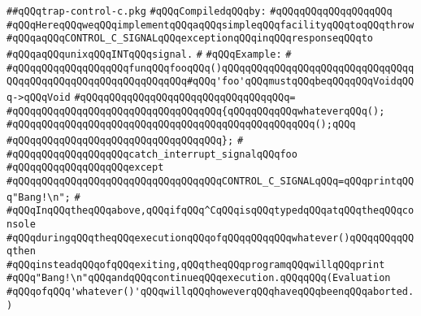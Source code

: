 \label{src/lib/std/trap-control-c.pkg}
\verb|##qQQqtrap-control-c.pkg|\newline
\newline
\verb|#qQQqCompiledqQQqby:|\newline
\verb|#qQQqqQQqqQQqqQQqqQQq|\newline
\newline
\newline
\verb|#qQQqHereqQQqweqQQqimplementqQQqaqQQqsimpleqQQqfacilityqQQqtoqQQqthrow|\newline
\verb|#qQQqaqQQqCONTROL_C_SIGNALqQQqexceptionqQQqinqQQqresponseqQQqto|\newline
\verb|#qQQqaqQQqunixqQQqINTqQQqsignal.|\newline
\verb|#|\newline
\verb|#qQQqExample:|\newline
\verb|#|\newline
\verb|#qQQqqQQqqQQqqQQqqQQqfunqQQqfooqQQq()qQQqqQQqqQQqqQQqqQQqqQQqqQQqqQQqqQQqqQQqqQQqqQQqqQQqqQQqqQQqqQQq#qQQq'foo'qQQqmustqQQqbeqQQqqQQqVoidqQQq->qQQqVoid|\newline
\verb|#qQQqqQQqqQQqqQQqqQQqqQQqqQQqqQQqqQQq=|\newline
\verb|#qQQqqQQqqQQqqQQqqQQqqQQqqQQqqQQqqQQq{qQQqqQQqqQQqwhateverqQQq();|\newline
\verb|#qQQqqQQqqQQqqQQqqQQqqQQqqQQqqQQqqQQqqQQqqQQqqQQqqQQq();qQQq|\newline
\verb|#qQQqqQQqqQQqqQQqqQQqqQQqqQQqqQQqqQQq};|\newline
\verb|#|\newline
\verb|#qQQqqQQqqQQqqQQqqQQqcatch_interrupt_signalqQQqfoo|\newline
\verb|#qQQqqQQqqQQqqQQqqQQqexcept|\newline
\verb|#qQQqqQQqqQQqqQQqqQQqqQQqqQQqqQQqqQQqCONTROL_C_SIGNALqQQq=qQQqprintqQQq"Bang!\n";|\newline
\verb|#|\newline
\verb|#qQQqInqQQqtheqQQqabove,qQQqifqQQq^CqQQqisqQQqtypedqQQqatqQQqtheqQQqconsole|\newline
\verb|#qQQqduringqQQqtheqQQqexecutionqQQqofqQQqqQQqqQQqwhatever()qQQqqQQqqQQqthen|\newline
\verb|#qQQqinsteadqQQqofqQQqexiting,qQQqtheqQQqprogramqQQqwillqQQqprint|\newline
\verb|#qQQq"Bang!\n"qQQqandqQQqcontinueqQQqexecution.qQQqqQQq(Evaluation|\newline
\verb|#qQQqofqQQq'whatever()'qQQqwillqQQqhoweverqQQqhaveqQQqbeenqQQqaborted.)|\newline
